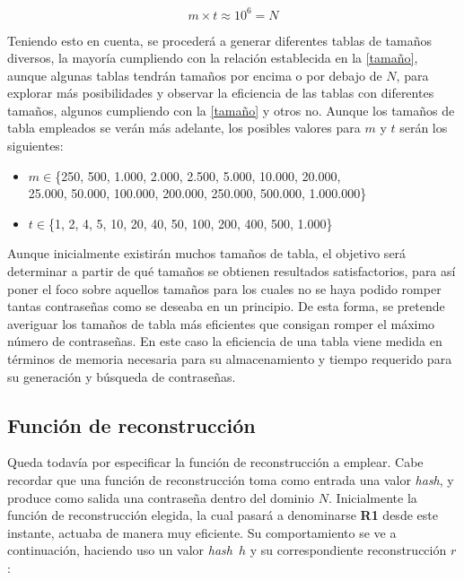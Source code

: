 \documentclass[12pt,spanish,listoffigures,listoftables]{tfgetsinf}
\newcommand{\hash}{\textit{hash}}
\begin{document}
\begin{center}
    \begin{equation}
        \tag{Fórmula 1}
        m \times t \approx 10^6 = N
        \label{tamaño}
    \end{equation}
\end{center}

Teniendo esto en cuenta, se procederá a generar diferentes tablas de tamaños diversos, la mayoría cumpliendo con la relación establecida en la \ref{tamaño}, aunque algunas tablas tendrán tamaños por encima o por debajo de $N$, para explorar más posibilidades y observar la eficiencia de las tablas con diferentes tamaños, algunos cumpliendo con la \ref{tamaño} y otros no. Aunque los tamaños de tabla empleados se verán más adelante, los posibles valores para $m$ y $t$ serán los siguientes:

\begin{itemize}

    \item $m \in $\{250, 500, 1.000, 2.000, 2.500, 5.000, 10.000, 20.000, \\
    25.000, 50.000, 100.000, 200.000, 250.000, 500.000, 1.000.000\}
    
    \item $t \in $\{1, 2, 4, 5, 10, 20, 40, 50, 100, 200, 400, 500, 1.000\}
    
\end{itemize}

Aunque inicialmente existirán muchos tamaños de tabla, el objetivo será determinar a partir de qué tamaños se obtienen resultados satisfactorios, para así poner el foco sobre aquellos tamaños para los cuales no se haya podido romper tantas contraseñas como se deseaba en un principio. De esta forma, se pretende averiguar los tamaños de tabla más eficientes que consigan romper el máximo número de contraseñas. En este caso la eficiencia de una tabla viene medida en términos de memoria necesaria para su almacenamiento y tiempo requerido para su generación y búsqueda de contraseñas.

\subsection{Función de reconstrucción}

Queda todavía por especificar la función de reconstrucción a emplear. Cabe recordar que una función de reconstrucción toma como entrada una valor \hash, y produce como salida una contraseña dentro del dominio $N$. Inicialmente la función de reconstrucción elegida, la cual pasará a denominarse \textbf{R1} desde este instante, actuaba de manera muy eficiente. Su comportamiento se ve a continuación, haciendo uso un valor \hash~$h$ y su correspondiente reconstrucción $r$:
\end{document}
